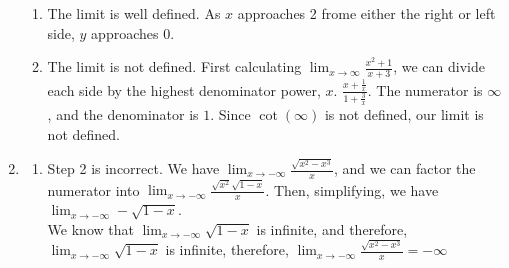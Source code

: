 \documentclass[11pt, letterpaper, twoside]{article}
\begin{document}
\begin{enumerate}
\begin{enumerate}[label=(\alph*)]
\item %
The limit is well defined. As $x$ approaches 2 frome either the right or left side, $y$ approaches 0.
\item %
The limit is not defined. First calculating $\lim_{x\to \infty}\frac{x^2+1}{x+3}$, we can divide each side by the highest denominator power, $x$. $\frac{x+\frac{1}{x}}{1+\frac{3}{x}}$. The numerator is $\infty$, and the denominator is $1$. Since $\cot (\infty)$ is not defined, our limit is not defined.
\end{enumerate}
\item \begin{enumerate}[label=(\alph*)] %
\item %
Step 2 is incorrect. We have $\lim_{x\to -\infty}\frac{\sqrt{x^2-x^3}}{x}$, and we can factor the numerator into $\lim_{x\to -\infty}\frac{\sqrt{x^2}\sqrt{1-x}}{x}$. Then, simplifying, we have $\lim_{x\to -\infty}-\sqrt{1-x}$.\\

We know that $\lim_{x\to -\infty} \sqrt{1-x}$ is infinite, and therefore, $\lim_{x\to - \infty} \sqrt {1-x}$ is infinite, therefore, $\lim_{x\to -\infty}\frac{\sqrt{x^2-x^3}}{x}=\boxed{-\infty}$


\end{enumerate}
\end{enumerate}
\end{document}
